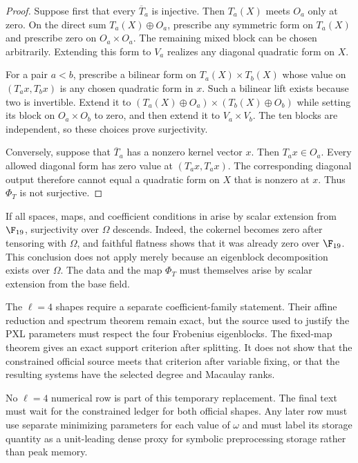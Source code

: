 \begin{proof}
Suppose first that every $\overline T_a$ is injective.  Then $T_a(X)$ meets
$O_a$ only at zero.  On the direct sum $T_a(X)\oplus O_a$, prescribe any
symmetric form on $T_a(X)$ and prescribe zero on $O_a\times O_a$.  The
remaining mixed block can be chosen arbitrarily.  Extending this form to
$V_a$ realizes any diagonal quadratic form on $X$.

For a pair $a<b$, prescribe a bilinear form on
$T_a(X)\times T_b(X)$ whose value on $(T_a x,T_b x)$ is any chosen quadratic
form in $x$.  Such a bilinear lift exists because two is invertible.  Extend
it to
$(T_a(X)\oplus O_a)\times(T_b(X)\oplus O_b)$ while setting its block on
$O_a\times O_b$ to zero, and then extend it to $V_a\times V_b$.  The ten
blocks are independent, so these choices prove surjectivity.

Conversely, suppose that $\overline T_a$ has a nonzero kernel vector $x$.
Then $T_a x\in O_a$.  Every allowed diagonal form has zero value at
$(T_a x,T_a x)$.  The corresponding diagonal output therefore cannot equal
a quadratic form on $X$ that is nonzero at $x$.  Thus $\Phi_T$ is not
surjective.
\end{proof}

If all spaces, maps, and coefficient conditions in
 arise by scalar extension from
$\F_{19}$, surjectivity over $\Omega$ descends.  Indeed, the cokernel becomes
zero after tensoring with $\Omega$, and faithful flatness shows that it was
already zero over $\F_{19}$.  This conclusion does not apply merely because
an eigenblock decomposition exists over $\Omega$.  The data and the map
$\Phi_T$ must themselves arise by scalar extension from the base field.

The $\ell=4$ shapes require a separate coefficient-family statement.  Their
affine reduction and spectrum theorem remain exact, but the source used to
justify the PXL parameters must respect the four Frobenius eigenblocks.  The
fixed-map theorem gives an exact support criterion after splitting.  It does
not show that the constrained official source meets that criterion after
variable fixing, or that the resulting systems have the selected degree and
Macaulay ranks.

No $\ell=4$ numerical row is part of this temporary replacement.  The final
text must wait for the constrained ledger for both official shapes.  Any
later row must use separate minimizing
parameters for each value of $\omega$ and must label its storage quantity as
a unit-leading dense proxy for symbolic preprocessing storage rather than
peak memory.
